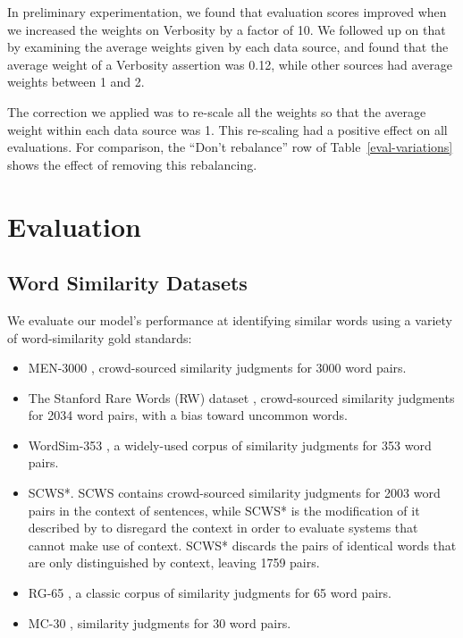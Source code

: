 \documentclass[letterpaper]{article}
\begin{document}
In preliminary experimentation, we found that evaluation scores improved when
we increased the weights on Verbosity by a factor of 10. We followed up on that
by examining the average weights given by each data source, and found that the
average weight of a Verbosity assertion was 0.12, while other sources had
average weights between 1 and 2.

The correction we applied was to re-scale all the weights so that the average
weight within each data source was 1. This re-scaling had a positive effect
on all evaluations. For comparison, the ``Don't rebalance'' row of
Table~\ref{eval-variations} shows the effect of removing this rebalancing.

\section{Evaluation}

\subsection{Word Similarity Datasets}

We evaluate our model's performance at identifying similar words using a
variety of word-similarity gold standards:

\begin{itemize}
\item MEN-3000 \cite{bruni2014men}, crowd-sourced similarity judgments for 3000
    word pairs.
\item The Stanford Rare Words (RW) dataset \cite{luong2013rw}, crowd-sourced
    similarity judgments for 2034 word pairs, with a bias toward uncommon words.
\item WordSim-353 \cite{finkelstein2001ws}, a widely-used corpus of similarity
    judgments for 353 word pairs.
\item SCWS*. SCWS \cite{huang2012scws} contains crowd-sourced similarity
    judgments for 2003 word pairs in the context of sentences, while SCWS* is
    the modification of it described by 
    to disregard the context in order to evaluate
    systems that cannot make use of context. SCWS* discards the pairs of
    identical words that are only distinguished by context, leaving 1759 pairs.
\item RG-65 \cite{rubenstein1965rg}, a classic corpus of similarity judgments
    for 65 word pairs.
\item MC-30 \cite{miller1991mc}, similarity judgments for 30 word pairs.
\end{itemize}
\end{document}
